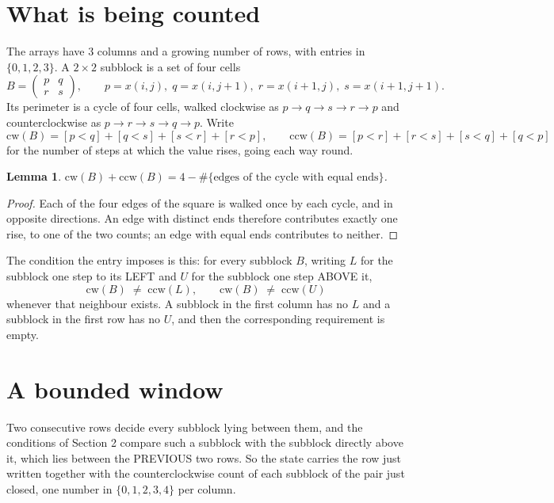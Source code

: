 \documentclass[11pt,a4paper]{article}
\theoremstyle{plain}
\newtheorem{lemma}[theorem]{Lemma}
\theoremstyle{definition}
\begin{document}
\section{What is being counted}

The arrays have $3$ columns and a growing number of rows, with entries in $\{0,1,2,3\}$. A
$2\times2$ subblock is a set of four cells
\[
B=\begin{pmatrix} p & q \\ r & s \end{pmatrix},
\qquad p=x(i,j),\; q=x(i,j+1),\; r=x(i+1,j),\; s=x(i+1,j+1).
\]
Its perimeter is a cycle of four cells, walked clockwise as $p\to q\to s\to r\to p$ and
counterclockwise as $p\to r\to s\to q\to p$. Write
\[
\mathrm{cw}(B)=[p<q]+[q<s]+[s<r]+[r<p],\qquad
\mathrm{ccw}(B)=[p<r]+[r<s]+[s<q]+[q<p]
\]
for the number of steps at which the value rises, going each way round.

\begin{lemma}\label{lem:sum}
$\mathrm{cw}(B)+\mathrm{ccw}(B)=4-\#\{\text{edges of the cycle with equal ends}\}$.
\end{lemma}

\begin{proof}
Each of the four edges of the square is walked once by each cycle, and in opposite directions.
An edge with distinct ends therefore contributes exactly one rise, to one of the two counts;
an edge with equal ends contributes to neither.
\end{proof}

The condition the entry imposes is this: for every subblock $B$, writing $L$ for the subblock one step to its LEFT and $U$ for the subblock one step ABOVE it,
\[
\mathrm{cw}(B)\;\ne\;\mathrm{ccw}(L),\qquad \mathrm{cw}(B)\;\ne\;\mathrm{ccw}(U)
\]
whenever that neighbour exists. A subblock in the first column has no $L$ and a subblock in the first row has no $U$, and then the corresponding requirement is empty.

\section{A bounded window}

Two consecutive rows decide every subblock lying between them, and the conditions of Section 2 compare such a subblock with the subblock directly above it, which lies between the PREVIOUS two rows. So the state carries the row just written together with the counterclockwise count of each subblock of the pair just closed, one number in $\{0,1,2,3,4\}$ per column.
\end{document}
